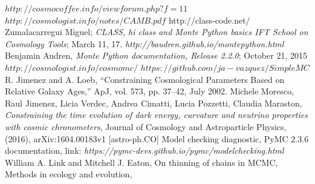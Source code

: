 \documentclass[onecolumn,           %
               showpacs,            %
               preprintnumbers,     %
               aps,                 %
               prl,          	    %
               letterpaper,             %
               superscriptaddress,      %
               nofootinbib,         %
               tightenlines,        %
               floats,floatfix      %
               ,usenatbib,
               ]{revtex4-1}
\begin{document}
\begin{thebibliography}{9}
$http://cosmocoffee.info/viewforum.php?f=11$
 $http://cosmologist.info/notes/CAMB.pdf$
 http://class-code.net/
Zumalacarregui Miguel; \textit{CLASS, hi class and Monte Python basics IFT School on Cosmology Tools}; March 11, 17.
\textit{http://baudren.github.io/montepython.html}
Benjamin Audren, \textit{Monte Python documentation, Release 2.2.0}; October 21, 2015
$http://cosmologist.info/cosmomc/$	
$https://github.com/ja-vazquez/SimpleMC$
%
%
%
%
%
%
R. Jimenez and A. Loeb, “Constraining Cosmological Parameters Based on Relative Galaxy Ages,”
ApJ, vol. 573, pp. 37–42, July 2002.
Michele Moresco, Raul Jimenez, Licia Verdec, Andrea Cimatti, Lucia Pozzetti, Claudia Maraston, \textit{Constraining the time evolution of dark energy, curvature and neutrino properties with cosmic chronometers}, Journal of Cosmology and Astroparticle Physics, (2016), arXiv:1604.00183v1 [astro-ph.CO]
 Model checking diagnostic, PyMC 2.3.6 documentation, link: \textit{https://pymc-devs.github.io/pymc/modelchecking.html}
William A. Link and Mitchell J. Eaton, On thinning of chains in MCMC, Methods in ecology and evolution,


\end{thebibliography}
\end{document}
